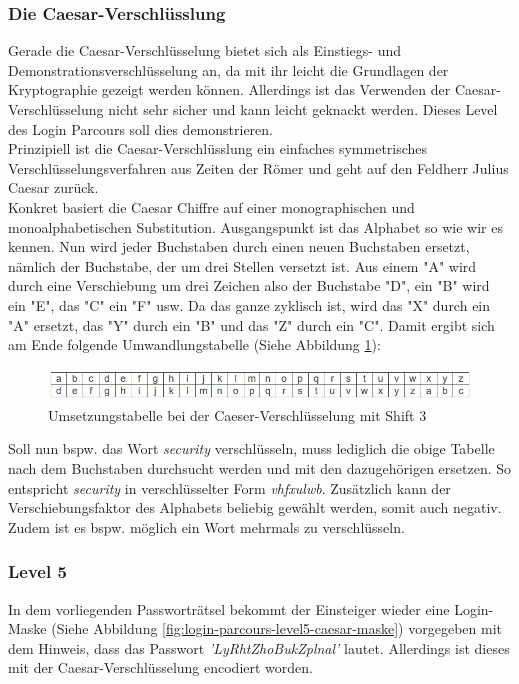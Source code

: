 \subsubsection*{Die Caesar-Verschlüsslung}
Gerade die Caesar-Verschlüsselung bietet sich als Einstiegs- und Demonstrationsverschlüsselung an, da mit ihr leicht die Grundlagen der Kryptographie gezeigt werden können. Allerdings ist das Verwenden der Caesar-Verschlüsselung nicht sehr sicher und kann leicht geknackt werden. Dieses Level des Login Parcours soll dies demonstrieren. \\ 
Prinzipiell ist die Caesar-Verschlüsslung ein einfaches symmetrisches Verschlüsselungsverfahren aus Zeiten der Römer und geht auf den Feldherr Julius Caesar zurück. \\
Konkret basiert die Caesar Chiffre auf einer monographischen und monoalphabetischen Substitution. Ausgangspunkt ist das Alphabet so wie wir es kennen. Nun wird jeder Buchstaben durch einen neuen Buchstaben ersetzt, nämlich der Buchstabe, der um drei Stellen versetzt ist. Aus einem "A" wird durch eine Verschiebung um drei Zeichen also der Buchstabe "D", ein "B" wird ein "E", das "C" ein "F" usw. Da das ganze zyklisch ist, wird das "X" durch ein "A" ersetzt, das "Y" durch ein "B" und das "Z" durch ein "C". Damit ergibt sich am Ende folgende Umwandlungstabelle (Siehe Abbildung \ref{fig:login-parcours-level5-caesar-theorie}):  

\begin{figure}[H]
	\centering
	\includegraphics[width=\textwidth]{images/LoginParcours/login_parcrous_level5_caesar.jpg}
	\caption{Umsetzungstabelle bei der Caeser-Verschlüsselung mit Shift 3}
	\label{fig:login-parcours-level5-caesar-theorie}
\end{figure} 

Soll nun bspw. das Wort \textit{security} verschlüsseln, muss lediglich die obige Tabelle nach dem Buchstaben durchsucht werden und mit den dazugehörigen ersetzen. So entspricht \textit{security} in verschlüsselter Form \textit{vhfxulwb}. Zusätzlich kann der Verschiebungsfaktor des Alphabets beliebig gewählt werden, somit auch negativ. Zudem ist es bspw. möglich ein Wort mehrmals zu verschlüsseln. \\ 

\subsubsection*{Level 5}
In dem vorliegenden Passworträtsel bekommt der Einsteiger wieder eine Login-Maske (Siehe Abbildung \ref{fig:login-parcours-level5-caesar-maske}) vorgegeben mit dem Hinweis, dass das Passwort \textit{'LyRhtZhoBukZplnal'} lautet. Allerdings ist dieses mit der Caesar-Verschlüsselung encodiert worden.

